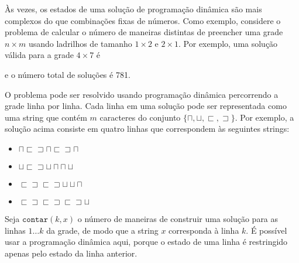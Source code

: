 Às vezes, os estados de uma solução de programação dinâmica
são mais complexos do que combinações fixas de números.
Como exemplo,
considere o problema de calcular
o número de maneiras distintas de
preencher uma grade $n \times m$ usando
ladrilhos de tamanho $1 \times 2$ e $2 \times 1$.
Por exemplo, uma solução válida
para a grade $4 \times 7$ é
\begin{center}
\end{center}
e o número total de soluções é 781.

O problema pode ser resolvido usando programação dinâmica
percorrendo a grade linha por linha.
Cada linha em uma solução pode ser representada como uma
string que contém $m$ caracteres do conjunto
$\{\sqcap, \sqcup, \sqsubset, \sqsupset \}$.
Por exemplo, a solução acima consiste em quatro linhas
que correspondem às seguintes strings:
\begin{itemize}
\item
$\sqcap \sqsubset \sqsupset \sqcap \sqsubset \sqsupset \sqcap$
\item
$\sqcup \sqsubset \sqsupset \sqcup \sqcap \sqcap \sqcup$
\item
$\sqsubset \sqsupset \sqsubset \sqsupset \sqcup \sqcup \sqcap$ 
\item
$\sqsubset \sqsupset \sqsubset \sqsupset \sqsubset \sqsupset \sqcup$
\end{itemize}

Seja $\texttt{contar}(k,x)$ o número de maneiras de
construir uma solução para as linhas $1 \ldots k$
da grade, de modo que a string $x$ corresponda à linha $k$.
É possível usar a programação dinâmica aqui,
porque o estado de uma linha é restringido
apenas pelo estado da linha anterior.

